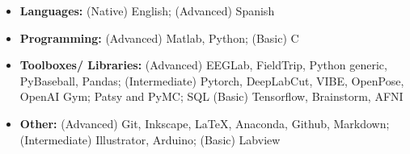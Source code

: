 \begin{adjustwidth}{-.75em}{0pt}
    \begin{itemize}
    \item[] \textbf{Languages:} (Native) English; (Advanced) Spanish\\
    \item[] \textbf{Programming: }(Advanced) Matlab, Python; (Basic) C
    \item[] \textbf{Toolboxes/ Libraries:} (Advanced) EEGLab, FieldTrip, Python generic, PyBaseball, Pandas; (Intermediate) Pytorch, DeepLabCut, VIBE, OpenPose, OpenAI Gym; Patsy and PyMC; SQL (Basic) Tensorflow, Brainstorm, AFNI
    \item[] \textbf{Other:} (Advanced) Git, Inkscape, LaTeX, Anaconda, Github, Markdown; (Intermediate) Illustrator,  Arduino; (Basic) Labview
    \end{itemize}
\end{adjustwidth}